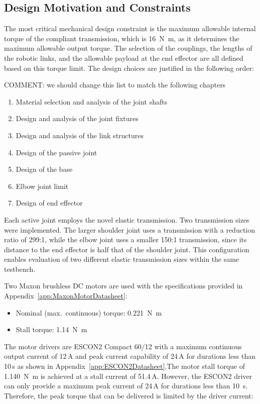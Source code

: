 \documentclass[11pt,a4paper,twoside,openright]{book}
\begin{document}
\subsection{Design Motivation and Constraints}

The most critical mechanical design constraint is the maximum allowable internal torque of the compliant transmission, which is \SI{16}{\newton\meter}, as it determines the maximum allowable output torque. The selection of the couplings, the lengths of the robotic links, and the allowable payload at the end effector are all defined based on this torque limit. The design choices are justified in the following order:

COMMENT: we should change this list to match the following chapters

\begin{enumerate}
    \item Material selection and analysis of the joint shafts
    \item Design and analysis of the joint fixtures
    \item Design and analysis of the link structures
    \item Design of the passive joint
    \item Design of the base
    \item Elbow joint limit
    \item Design of end effector
\end{enumerate}

Each active joint employs the novel elastic transmission. Two transmission sizes were implemented. The larger shoulder joint uses a transmission with a reduction ratio of 299:1, while the elbow joint uses a smaller 150:1 transmission, since its distance to the end effector is half that of the shoulder joint. This configuration enables evaluation of two different elastic transmission sizes within the same testbench.

Two Maxon brushless DC motors are used with the specifications provided in Appendix~\ref{app:MaxonMotorDatasheet}:
\begin{itemize}
	\item Nominal (max.~continuous) torque: \SI{0.221}{\newton\meter}
	\item Stall torque: \SI{1.14}{\newton\meter}
\end{itemize}
 
The motor drivers are ESCON2 Compact 60/12 with a maximum continuous output current of 12\,A and peak current capability of 24\,A for durations less than 10\,s as shown in Appendix~\ref{app:ESCON2Datasheet}.The motor stall torque of \SI{1.140}{\newton\meter} is achieved at a stall current of 51.4\,A. However, the ESCON2 driver can only provide a maximum peak current of 24\,A for durations less than \SI{10}{\second}. Therefore, the peak torque that can be delivered is limited by the driver current:
\end{document}

